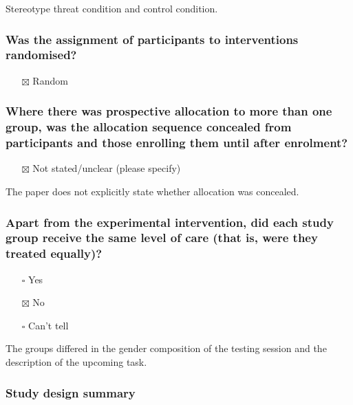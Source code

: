\documentclass[
  doc, a4paper]{apa7}
\providecommand{\tightlist}{%
  \setlength{\itemsep}{0pt}\setlength{\parskip}{0pt}}
\begin{document}
Stereotype threat condition and control condition.

\subsubsection{Was the assignment of participants to interventions randomised?}\label{was-the-assignment-of-participants-to-interventions-randomised}

\begin{itemize}
\tightlist
\item[$\boxtimes$]
  Random
\end{itemize}

\subsubsection{Where there was prospective allocation to more than one group, was the allocation sequence concealed from participants and those enrolling them until after enrolment?}\label{where-there-was-prospective-allocation-to-more-than-one-group-was-the-allocation-sequence-concealed-from-participants-and-those-enrolling-them-until-after-enrolment}

\begin{itemize}
\tightlist
\item[$\boxtimes$]
  Not stated/unclear (please specify)
\end{itemize}

The paper does not explicitly state whether allocation was concealed.

\subsubsection{Apart from the experimental intervention, did each study group receive the same level of care (that is, were they treated equally)?}\label{apart-from-the-experimental-intervention-did-each-study-group-receive-the-same-level-of-care-that-is-were-they-treated-equally}

\begin{itemize}
\tightlist
\item[$\square$]
  Yes
\item[$\boxtimes$]
  No
\item[$\square$]
  Can't tell
\end{itemize}

The groups differed in the gender composition of the testing session and the description of the upcoming task.

\subsubsection{Study design summary}\label{study-design-summary}
\end{document}
